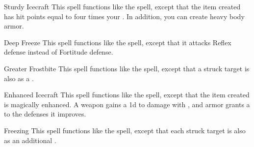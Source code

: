 \lowercase{\hypertarget{spell:Sturdy Icecraft}{}}\label{spell:Sturdy Icecraft}
\begin{ability}[\nth{2}]{\hypertarget{spell:Sturdy Icecraft}{Sturdy Icecraft}}
This spell functions like the  spell, except that the item created has hit points equal to four times your .
In addition, you can create heavy body armor.
\end{ability}
\vspace{0.25em}



\lowercase{\hypertarget{spell:Deep Freeze}{}}\label{spell:Deep Freeze}
\begin{ability}[\nth{3}]{\hypertarget{spell:Deep Freeze}{Deep Freeze}}
This spell functions like the  spell, except that it attacks Reflex defense instead of Fortitude defense.
\end{ability}
\vspace{0.25em}



\lowercase{\hypertarget{spell:Greater Frostbite}{}}\label{spell:Greater Frostbite}
\begin{ability}[\nth{3}]{\hypertarget{spell:Greater Frostbite}{Greater Frostbite}}
This spell functions like the  spell, except that a struck target is also  as a .
\end{ability}
\vspace{0.25em}



\lowercase{\hypertarget{spell:Enhanced Icecraft}{}}\label{spell:Enhanced Icecraft}
\begin{ability}[\nth{4}]{\hypertarget{spell:Enhanced Icecraft}{Enhanced Icecraft}}
This spell functions like the  spell, except that the item created is magically enhanced.
A weapon gains a \plus1d  to damage with , and armor grants a   to the defenses it improves.
\end{ability}
\vspace{0.25em}



\lowercase{\hypertarget{spell:Freezing}{}}\label{spell:Freezing}
\begin{ability}[\nth{4}]{\hypertarget{spell:Freezing}{Freezing}}
This spell functions like the  spell, except that each struck target is also  as an additional .
\end{ability}
\vspace{0.25em}



